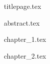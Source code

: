 \documentclass[12pt, a4paper]{article}
\begin{document}
{titlepage.tex}
\newpage

{abstract.tex}
\newpage

\tableofcontents{}
\newpage

\listoffigures
\newpage


{chapter_1.tex}
\newpage

{chapter_2.tex}
\newpage

\printbibliography
\end{document}
